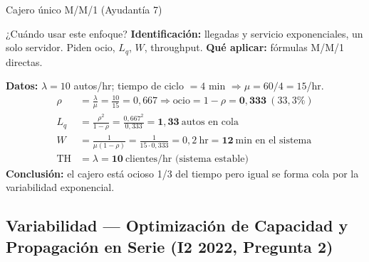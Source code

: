 \begin{ejercicio}{Cajero único M/M/1 (Ayudantía 7)}

\begin{tipprueba}{¿Cuándo usar este enfoque?}
\textbf{Identificación:} llegadas y servicio exponenciales, un solo servidor. Piden ocio, $L_q$, $W$, throughput. \textbf{Qué aplicar:} fórmulas M/M/1 directas.
\end{tipprueba}

\textbf{Datos:} $\lambda = 10$ autos/hr; tiempo de ciclo $= 4$ min $\Rightarrow \mu = 60/4 = 15$/hr.
\begin{align*}
  \rho &= \tfrac{\lambda}{\mu} = \tfrac{10}{15} = 0{,}667 \Rightarrow \text{ocio} = 1-\rho = \mathbf{0{,}333}\ (33{,}3\%)\\
  L_q &= \tfrac{\rho^2}{1-\rho} = \tfrac{0{,}667^2}{0{,}333} = \mathbf{1{,}33}\ \text{autos en cola}\\
  W &= \tfrac{1}{\mu(1-\rho)} = \tfrac{1}{15\cdot0{,}333} = 0{,}2\ \text{hr} = \mathbf{12}\ \text{min en el sistema}\\
  \text{TH} &= \lambda = \mathbf{10}\ \text{clientes/hr (sistema estable)}
\end{align*}
\textbf{Conclusión:} el cajero está ocioso 1/3 del tiempo pero igual se forma cola por la variabilidad exponencial.
\end{ejercicio}


\subsection[Variabilidad: Capacidad (I2 2022)]{Variabilidad --- Optimización de Capacidad y Propagación en Serie (I2 2022, Pregunta 2)}

